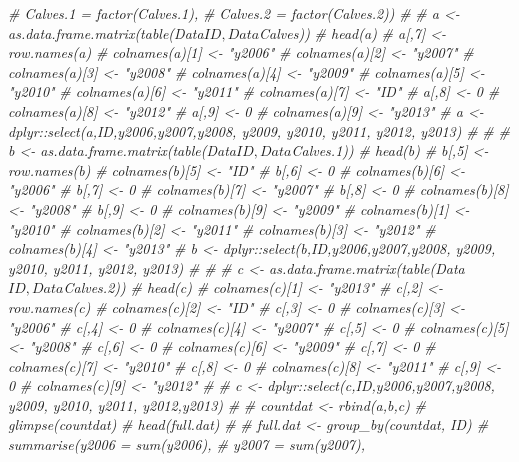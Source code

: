 \documentclass[]{book}
\newenvironment{Shaded}{\begin{snugshade}}{\end{snugshade}}
\newcommand{\CommentTok}[1]{\textcolor[rgb]{0.56,0.35,0.01}{\textit{#1}}}
\begin{document}
\begin{Shaded}
\begin{Highlighting}[]
{{{{{{{{{{{{{{{{{{{{\CommentTok{#                          Calves.1 = factor(Calves.1),}
\CommentTok{#                          Calves.2 = factor(Calves.2))}
\CommentTok{# }
\CommentTok{# a <- as.data.frame.matrix(table(Data$ID,Data$Calves))}
\CommentTok{# head(a)}
\CommentTok{# a[,7] <-row.names(a)}
\CommentTok{# colnames(a)[1] <- "y2006"}
\CommentTok{# colnames(a)[2] <- "y2007"}
\CommentTok{# colnames(a)[3] <- "y2008"}
\CommentTok{# colnames(a)[4] <- "y2009"}
\CommentTok{# colnames(a)[5] <- "y2010"}
\CommentTok{# colnames(a)[6] <- "y2011"}
\CommentTok{# colnames(a)[7] <- "ID"}
\CommentTok{# a[,8] <- 0}
\CommentTok{# colnames(a)[8] <- "y2012"}
\CommentTok{# a[,9] <- 0}
\CommentTok{# colnames(a)[9] <- "y2013"}
\CommentTok{# a <- dplyr::select(a,ID,y2006,y2007,y2008, y2009, y2010, y2011, y2012, y2013)}
\CommentTok{# }
\CommentTok{# }
\CommentTok{# b <- as.data.frame.matrix(table(Data$ID,Data$Calves.1))}
\CommentTok{# head(b)}
\CommentTok{# b[,5] <-row.names(b)}
\CommentTok{# colnames(b)[5] <- "ID"}
\CommentTok{# b[,6] <- 0}
\CommentTok{# colnames(b)[6] <- "y2006"}
\CommentTok{# b[,7] <- 0}
\CommentTok{# colnames(b)[7] <- "y2007"}
\CommentTok{# b[,8] <- 0}
\CommentTok{# colnames(b)[8] <- "y2008"}
\CommentTok{# b[,9] <- 0}
\CommentTok{# colnames(b)[9] <- "y2009"}
\CommentTok{# colnames(b)[1] <- "y2010"}
\CommentTok{# colnames(b)[2] <- "y2011"}
\CommentTok{# colnames(b)[3] <- "y2012"}
\CommentTok{# colnames(b)[4] <- "y2013"}
\CommentTok{# b <- dplyr::select(b,ID,y2006,y2007,y2008, y2009, y2010, y2011, y2012, y2013)}
\CommentTok{# }
\CommentTok{# }
\CommentTok{# c <- as.data.frame.matrix(table(Data$ID,Data$Calves.2))}
\CommentTok{# head(c)}
\CommentTok{# colnames(c)[1] <- "y2013"}
\CommentTok{# c[,2] <-row.names(c)}
\CommentTok{# colnames(c)[2] <- "ID"}
\CommentTok{# c[,3] <- 0}
\CommentTok{# colnames(c)[3] <- "y2006"}
\CommentTok{# c[,4] <- 0}
\CommentTok{# colnames(c)[4] <- "y2007"}
\CommentTok{# c[,5] <- 0}
\CommentTok{# colnames(c)[5] <- "y2008"}
\CommentTok{# c[,6] <- 0}
\CommentTok{# colnames(c)[6] <- "y2009"}
\CommentTok{# c[,7] <- 0}
\CommentTok{# colnames(c)[7] <- "y2010"}
\CommentTok{# c[,8] <- 0}
\CommentTok{# colnames(c)[8] <- "y2011"}
\CommentTok{# c[,9] <- 0}
\CommentTok{# colnames(c)[9] <- "y2012"}
\CommentTok{# }
\CommentTok{# c <- dplyr::select(c,ID,y2006,y2007,y2008, y2009, y2010, y2011, y2012,y2013)}
\CommentTok{# }
\CommentTok{# countdat <- rbind(a,b,c)}
\CommentTok{# glimpse(countdat)}
\CommentTok{# head(full.dat)}
\CommentTok{# }
\CommentTok{# full.dat <- group_by(countdat, ID) %>%}
\CommentTok{#   summarise(y2006 = sum(y2006),}
\CommentTok{#             y2007 = sum(y2007),}
}}}}}}}}}}}}}}}}}}}}}
\end{Highlighting}
\end{Shaded}
\end{document}

